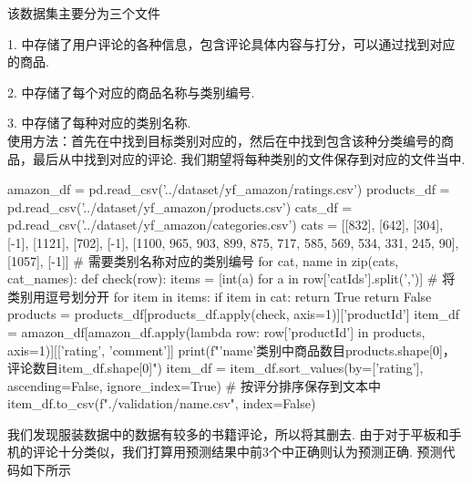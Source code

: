 \documentclass[12pt, a4paper, oneside]{ctexart}
\numberwithin{equation}{section}  %
\begin{document}
该数据集主要分为三个文件

1. 中存储了用户评论的各种信息，包含评论具体内容与打分，可以通过找到对应的商品.

2. 中存储了每个对应的商品名称与类别编号.

3. 中存储了每种对应的类别名称.
\\
使用方法：首先在中找到目标类别对应的，然后在中找到包含该种分类编号的商品，最后从中找到对应的评论. 我们期望将每种类别的文件保存到对应的文件当中.

\begin{pythoncode}
amazon_df = pd.read_csv('../dataset/yf_amazon/ratings.csv')
products_df = pd.read_csv('../dataset/yf_amazon/products.csv')
cats_df = pd.read_csv('../dataset/yf_amazon/categories.csv')
cats = [[832], [642], [304], [-1], [1121], [702], [-1],
        [1100, 965, 903, 899, 875, 717, 585, 569, 534, 331, 245, 90], [1057], [-1]]  # 需要类别名称对应的类别编号
for cat, name in zip(cats, cat_names):
    def check(row):
        items = [int(a) for a in row['catIds'].split(',')]  # 将类别用逗号划分开
        for item in items:
            if item in cat:
                return True
        return False
    products = products_df[products_df.apply(check, axis=1)]['productId']
    item_df = amazon_df[amazon_df.apply(lambda row: row['productId'] in products, axis=1)][['rating', 'comment']]
    print(f"'{name}'类别中商品数目{products.shape[0]}，评论数目{item_df.shape[0]}")
    item_df = item_df.sort_values(by=['rating'], ascending=False, ignore_index=True)  # 按评分排序保存到文本中
    item_df.to_csv(f"./validation/{name}.csv", index=False)
\end{pythoncode}
我们发现服装数据中的数据有较多的书籍评论，所以将其删去. 由于对于平板和手机的评论十分类似，我们打算用预测结果中前3个中正确则认为预测正确. 预测代码如下所示
\end{document}
